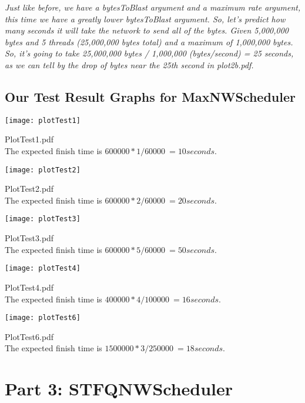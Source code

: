 \documentclass[11pt, letterpaper]{article}
\begin{document}
{\em Just like before, we have a bytesToBlast argument and a maximum rate argument, 
this time we have a greatly lower bytesToBlast argument. So, let's predict how many seconds
it will take the network to send all of the bytes. Given 5,000,000 bytes and 5 threads 
(25,000,000 bytes total) and a maximum of 1,000,000 bytes. So, it's going to take 
25,000,000 bytes / 1,000,000 (bytes/second) = 25 seconds, as we can tell by the drop 
of bytes near the 25th second in plot2b.pdf. }

\subsection{Our Test Result Graphs for MaxNWScheduler}

\centerline{\texttt{[image: plotTest1]}}

{\centering PlotTest1.pdf\\}
{\centering The expected finish time is $600000*1/60000 ~= 10 seconds$.
}

\centerline{\texttt{[image: plotTest2]}}

{\centering PlotTest2.pdf\\}
{\centering The expected finish time is $600000*2/60000 ~= 20 seconds$.
}

\centerline{\texttt{[image: plotTest3]}}

{\centering PlotTest3.pdf\\}
{\centering The expected finish time is $600000*5/60000 ~= 50 seconds$.
}

\centerline{\texttt{[image: plotTest4]}}

{\centering PlotTest4.pdf\\}
{\centering The expected finish time is $400000*4/100000 ~= 16 seconds$.
}

\centerline{\texttt{[image: plotTest6]}}

{\centering PlotTest6.pdf\\}
{\centering The expected finish time is $1500000*3/250000 ~= 18 seconds$.
}



\section{Part 3: STFQNWScheduler}
\end{document}
